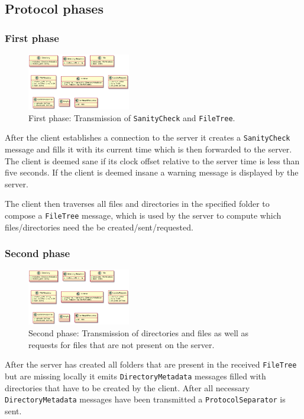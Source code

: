 \documentclass[a4paper]{article}
\begin{document}
\subsection{Protocol phases}
\label{sec:phases}
\subsubsection{First phase}
\begin{figure}[H]
\centering
\includegraphics[width=4.5cm]{first_stage}
\caption{First phase: Transmission of \texttt{SanityCheck} and \texttt{FileTree}.}
\end{figure}

After the client establishes a connection to the server it creates a \texttt{SanityCheck} message and fills it with its current time which is then forwarded to the server. The client is deemed sane if its clock offset relative to the server time is less than five seconds. If the client is deemed insane a warning message is displayed by the server.

The client then traverses all files and directories in the specified folder to compose a \texttt{FileTree} message, which is used by the server to compute which files/directories need the be created/sent/requested.

\subsubsection{Second phase}
\begin{figure}[H]
\centering
\includegraphics[width=4.5cm]{second_stage}
\caption{Second phase: Transmission of directories and files as well as requests for files that are not present on the server.}
\label{fig:stage2}
\end{figure}

After the server has created all folders that are present in the received \texttt{FileTree} but are missing locally it emits \texttt{DirectoryMetadata} messages filled with directories that have to be created by the client. After all necessary \texttt{DirectoryMetadata} messages have been transmitted a \texttt{ProtocolSeparator} is sent.
\end{document}
